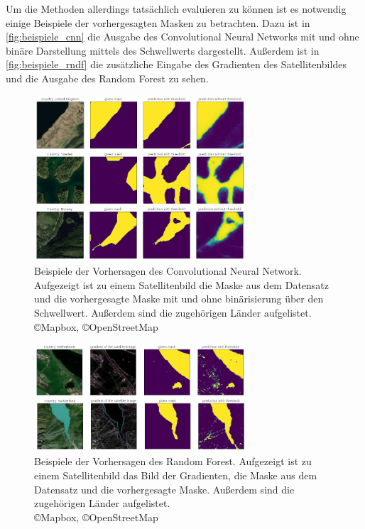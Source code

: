 Um die Methoden allerdings tatsächlich evaluieren zu können ist es notwendig einige Beispiele der vorhergesagten Masken zu betrachten.
Dazu ist in \autoref{fig:beispiele_cnn} die Ausgabe des Convolutional Neural Networks mit und ohne binäre Darstellung mittels des Schwellwerts dargestellt.
Außerdem ist in \autoref{fig:beispiele_rndf} die zusätzliche Eingabe des Gradienten des Satellitenbildes und die Ausgabe des Random Forest zu sehen.

\begin{figure}
    \centering
    \includegraphics[width=0.7\textwidth]{images/bsp_cnn.png}
    \caption{Beispiele der Vorhersagen des Convolutional Neural Network. %
    Aufgezeigt ist zu einem Satellitenbild die Maske aus dem Datensatz und %
    die vorhergesagte Maske mit und ohne binärisierung über den Schwellwert. %
    Außerdem sind die zugehörigen Länder aufgelistet.\\ \copyright Mapbox, \copyright OpenStreetMap}
    \label{fig:beispiele_cnn}
\end{figure}

\begin{figure}
    \centering
    \includegraphics[width=0.7\textwidth]{images/bsp_rndf.png}
    \caption{Beispiele der Vorhersagen des Random Forest. %
    Aufgezeigt ist zu einem Satellitenbild das Bild der Gradienten, %
    die Maske aus dem Datensatz und %
    die vorhergesagte Maske. %
    Außerdem sind die zugehörigen Länder aufgelistet.\\ \copyright Mapbox, \copyright OpenStreetMap}
    \label{fig:beispiele_rndf}
\end{figure}

